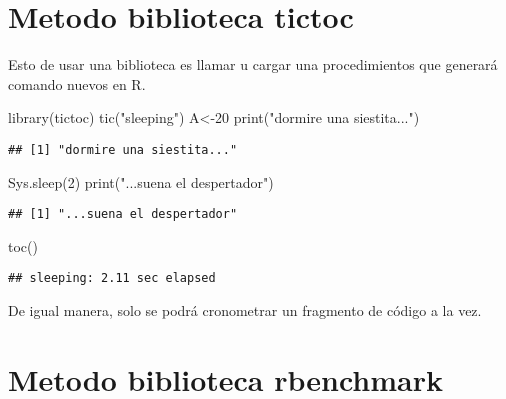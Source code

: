 \documentclass[]{elsarticle} %
\newenvironment{Shaded}{\begin{snugshade}}{\end{snugshade}}
\newcommand{\DecValTok}[1]{\textcolor[rgb]{0.00,0.00,0.81}{#1}}
\newcommand{\FunctionTok}[1]{\textcolor[rgb]{0.00,0.00,0.00}{#1}}
\newcommand{\NormalTok}[1]{#1}
\newcommand{\OtherTok}[1]{\textcolor[rgb]{0.56,0.35,0.01}{#1}}
\newcommand{\StringTok}[1]{\textcolor[rgb]{0.31,0.60,0.02}{#1}}
\begin{document}
\hypertarget{metodo-biblioteca-tictoc}{%
\section{Metodo biblioteca tictoc}\label{metodo-biblioteca-tictoc}}

Esto de usar una biblioteca es llamar u cargar una procedimientos que
generará comando nuevos en R.

\begin{Shaded}
\begin{Highlighting}[]
\FunctionTok{library}\NormalTok{(tictoc)}
\FunctionTok{tic}\NormalTok{(}\StringTok{"sleeping"}\NormalTok{)}
\NormalTok{A}\OtherTok{\textless{}{-}}\DecValTok{20}
\FunctionTok{print}\NormalTok{(}\StringTok{"dormire una siestita..."}\NormalTok{)}
\end{Highlighting}
\end{Shaded}

\begin{verbatim}
## [1] "dormire una siestita..."
\end{verbatim}

\begin{Shaded}
\begin{Highlighting}[]
\FunctionTok{Sys.sleep}\NormalTok{(}\DecValTok{2}\NormalTok{)}
\FunctionTok{print}\NormalTok{(}\StringTok{"...suena el despertador"}\NormalTok{)}
\end{Highlighting}
\end{Shaded}

\begin{verbatim}
## [1] "...suena el despertador"
\end{verbatim}

\begin{Shaded}
\begin{Highlighting}[]
\FunctionTok{toc}\NormalTok{()}
\end{Highlighting}
\end{Shaded}

\begin{verbatim}
## sleeping: 2.11 sec elapsed
\end{verbatim}

De igual manera, solo se podrá cronometrar un fragmento de código a la
vez.

\hypertarget{metodo-biblioteca-rbenchmark}{%
\section{Metodo biblioteca
rbenchmark}\label{metodo-biblioteca-rbenchmark}}
\end{document}
